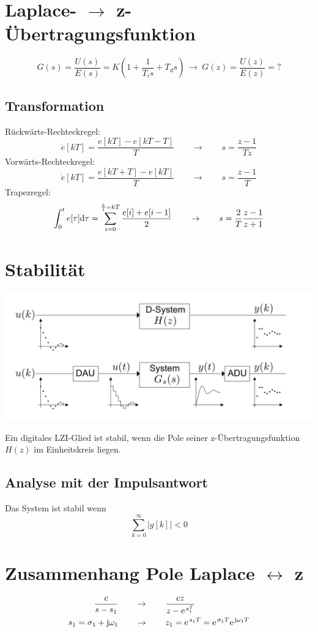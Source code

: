 \section{Laplace- $\rightarrow$ z-Übertragungsfunktion}
\[
	G(s) = \frac{U(s)}{E(s)} = K \left( 1 + \frac{1}{T_is}+T_ds\right) \ \rightarrow \ G(z) =  \frac{U(z)}{E(z)} = ?
\]

\subsection{Transformation}
Rückwärts-Rechteckregel:
\[
	\dot{e}[kT] = \frac{e[kT]-e[kT-T]}{T} \qquad \rightarrow \qquad s = \frac{z-1}{Tz}
\]
Vorwärts-Rechteckregel:
\[
	\dot{e}[kT] = \frac{e[kT+T]-e[kT]}{T} \qquad \rightarrow \qquad  s = \frac{z-1}{T}
\]
Trapezregel:
\[
	\int_{0}^{t}e[\tau]\mathrm{d}\tau = \sum_{i=0}^{\frac{k}{t}=kT}\frac{e[i]+e[i-1]}{2} \qquad \rightarrow \qquad s = \frac{2}{T} \frac{z-1}{z+1}
\]

\section{Stabilität}
\begin{center}
	\includegraphics[width=.8\textwidth]{./images/stabilitat}
\end{center}
Ein digitales LZI-Glied ist stabil, wenn die Pole seiner z-Übertragungsfunktion $H(z)$ im Einheitskreis liegen.

\subsection{Analyse mit der Impulsantwort}
Das System ist stabil wenn
\[ \sum_{k=0}^{\infty}|g[k]|<0 \]

\section{Zusammenhang Pole Laplace $\leftrightarrow$ z}
\[\begin{aligned}
	\frac{c}{s-s_1} \qquad &\rightarrow \qquad \frac{cz}{z-\mathrm{e\;\!}^{s_1^T}} \\
	s_1 = \sigma_1 + \mathrm{j}\omega_1 \qquad &\rightarrow \qquad  z_1=\mathrm{e\;\!}^{s_1T} = \mathrm{e\;\!}^{\sigma_1T}\mathrm{e\;\!}^{\mathrm{j}\omega_1T}
\end{aligned}\]

